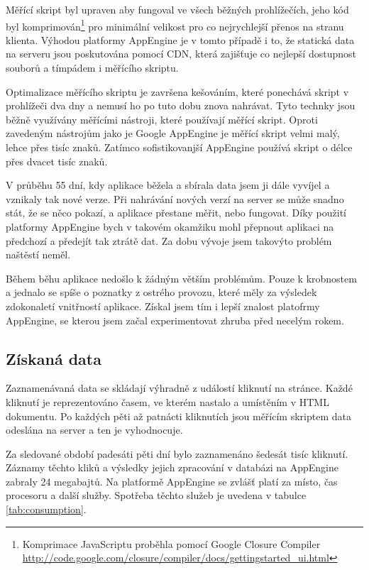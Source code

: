 \documentclass[bc,male,java,dept456]{diploma}						%
\begin{document}
Měřící skript byl upraven aby fungoval ve všech běžných prohlížečích, jeho kód byl komprimován\footnote{Komprimace JavaScriptu proběhla pomocí Google Closure Compiler \url{http://code.google.com/closure/compiler/docs/gettingstarted_ui.html}} pro minimální velikost pro co nejrychlejší přenos na stranu klienta. Výhodou platformy AppEngine je v tomto případě i to, že statická data na serveru jsou poskutována pomocí CDN\cite{cdn}, která zajišťuje co nejlepší dostupnost souborů a tímpádem i měřícího skriptu.

Optimalizace měřícího skriptu je završena kešováním, které ponechává skript v pro\-hlí\-že\-či dva dny a nemusí ho po tuto dobu znova nahrávat. Tyto technky jsou běžně využívány měřícími nástroji, které používají měřící skript. Oproti zavedeným nástrojům jako je Google AppEngine je měřící skript velmi malý, lehce přes tisíc znaků. Zatímco sofistikovanjší AppEngine používá skript o délce přes dvacet tisíc znaků.

V průběhu 55 dní, kdy aplikace běžela a sbírala data jsem ji dále vyvíjel a vznikaly tak nové verze. Při nahrávání nových verzí na server se může snadno stát, že se něco pokazí, a aplikace přestane měřit, nebo fungovat. Díky použití platformy AppEngine bych v  takovém okamžiku mohl přepnout aplikaci na předchozí a předejít tak ztrátě dat. Za dobu vývoje jsem takovýto problém naštěstí neměl.

Během běhu aplikace nedošlo k žádným větším problémům. Pouze k krobnostem a jednalo se spíše o poznatky z ostrého provozu, které měly za výsledek zdokonaletí vnitřností aplikace. Získal jsem tím i lepší znalost platofrmy AppEngine, se kterou jsem začal experimentovat zhruba před necelým rokem.


\subsection{Získaná data}

Zaznamenávaná data se skládají výhradně z událostí kliknutí na stránce. Každé kliknutí je reprezentováno časem, ve kterém nastalo a umístěním v HTML dokumentu. Po každých pěti až patnácti kliknutích jsou měřícím skriptem data odeslána na server a ten je vyhodnocuje.

Za sledované období padesáti pěti dní bylo zaznamenáno šedesát tisíc kliknutí. Zá\-zna\-my těchto kliků a výsledky jejich zpracování v databázi na AppEngine zabraly 24 megabajtů. Na platformě AppEngine se zvlášť platí\cite{billing} za místo, čas procesoru a další služby. Spotřeba těchto služeb je uvedena v tabulce \ref{tab:consumption}.
\end{document}
